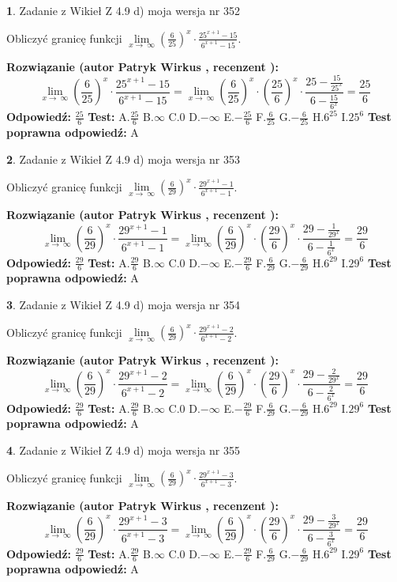 \documentclass[12pt, a4paper]{article}
\theoremstyle{definition} %
\newtheorem{zad}{}
\newcommand{\zadStart}[1]{\begin{zad}#1\newline}
\newcommand{\zadStop}{\end{zad}}
\newcommand{\rozwStart}[2]{\noindent \textbf{Rozwiązanie (autor #1 , recenzent #2): }\newline}
\newcommand{\rozwStop}{\newline}
\newcommand{\odpStart}{\noindent \textbf{Odpowiedź:}\newline}
\newcommand{\odpStop}{\newline}
\newcommand{\testStart}{\noindent \textbf{Test:}\newline}
\newcommand{\testStop}{\newline}
\newcommand{\kluczStart}{\noindent \textbf{Test poprawna odpowiedź:}\newline}
\newcommand{\kluczStop}{\newline}
\begin{document}
\zadStart{Zadanie z Wikieł Z 4.9 d) moja wersja nr 352}


Obliczyć granicę funkcji  $\lim\limits_{x\to\ \infty}(\frac{6}{25})^{x}\cdot\frac{25^{x+1}-15}{6^{x+1}-15}$.
\zadStop
\rozwStart{Patryk Wirkus}{}
$$\lim\limits_{x\to\ \infty}(\frac{6}{25})^{x}\cdot\frac{25^{x+1}-15}{6^{x+1}-15}=\lim\limits_{x\to\ \infty}(\frac{6}{25})^{x}\cdot(\frac{25}{6})^{x} \cdot \frac{25-\frac{15}{25^{x}}}{6-\frac{15}{6^{x}}} = \frac{25}{6}$$
\rozwStop
\odpStart
$\frac{25}{6}$
\odpStop
\testStart
A.$\frac{25}{6}$ B.$\infty$ C.$0$ D.$-\infty$ E.$-\frac{25}{6}$
F.$\frac{6}{25}$ G.$-\frac{6}{25}$
H.$6^{25}$
I.$25^{6}$
\testStop
\kluczStart
A
\kluczStop



\zadStart{Zadanie z Wikieł Z 4.9 d) moja wersja nr 353}


Obliczyć granicę funkcji  $\lim\limits_{x\to\ \infty}(\frac{6}{29})^{x}\cdot\frac{29^{x+1}-1}{6^{x+1}-1}$.
\zadStop
\rozwStart{Patryk Wirkus}{}
$$\lim\limits_{x\to\ \infty}(\frac{6}{29})^{x}\cdot\frac{29^{x+1}-1}{6^{x+1}-1}=\lim\limits_{x\to\ \infty}(\frac{6}{29})^{x}\cdot(\frac{29}{6})^{x} \cdot \frac{29-\frac{1}{29^{x}}}{6-\frac{1}{6^{x}}} = \frac{29}{6}$$
\rozwStop
\odpStart
$\frac{29}{6}$
\odpStop
\testStart
A.$\frac{29}{6}$ B.$\infty$ C.$0$ D.$-\infty$ E.$-\frac{29}{6}$
F.$\frac{6}{29}$ G.$-\frac{6}{29}$
H.$6^{29}$
I.$29^{6}$
\testStop
\kluczStart
A
\kluczStop



\zadStart{Zadanie z Wikieł Z 4.9 d) moja wersja nr 354}


Obliczyć granicę funkcji  $\lim\limits_{x\to\ \infty}(\frac{6}{29})^{x}\cdot\frac{29^{x+1}-2}{6^{x+1}-2}$.
\zadStop
\rozwStart{Patryk Wirkus}{}
$$\lim\limits_{x\to\ \infty}(\frac{6}{29})^{x}\cdot\frac{29^{x+1}-2}{6^{x+1}-2}=\lim\limits_{x\to\ \infty}(\frac{6}{29})^{x}\cdot(\frac{29}{6})^{x} \cdot \frac{29-\frac{2}{29^{x}}}{6-\frac{2}{6^{x}}} = \frac{29}{6}$$
\rozwStop
\odpStart
$\frac{29}{6}$
\odpStop
\testStart
A.$\frac{29}{6}$ B.$\infty$ C.$0$ D.$-\infty$ E.$-\frac{29}{6}$
F.$\frac{6}{29}$ G.$-\frac{6}{29}$
H.$6^{29}$
I.$29^{6}$
\testStop
\kluczStart
A
\kluczStop



\zadStart{Zadanie z Wikieł Z 4.9 d) moja wersja nr 355}


Obliczyć granicę funkcji  $\lim\limits_{x\to\ \infty}(\frac{6}{29})^{x}\cdot\frac{29^{x+1}-3}{6^{x+1}-3}$.
\zadStop
\rozwStart{Patryk Wirkus}{}
$$\lim\limits_{x\to\ \infty}(\frac{6}{29})^{x}\cdot\frac{29^{x+1}-3}{6^{x+1}-3}=\lim\limits_{x\to\ \infty}(\frac{6}{29})^{x}\cdot(\frac{29}{6})^{x} \cdot \frac{29-\frac{3}{29^{x}}}{6-\frac{3}{6^{x}}} = \frac{29}{6}$$
\rozwStop
\odpStart
$\frac{29}{6}$
\odpStop
\testStart
A.$\frac{29}{6}$ B.$\infty$ C.$0$ D.$-\infty$ E.$-\frac{29}{6}$
F.$\frac{6}{29}$ G.$-\frac{6}{29}$
H.$6^{29}$
I.$29^{6}$
\testStop
\kluczStart
A
\kluczStop
\end{document}
